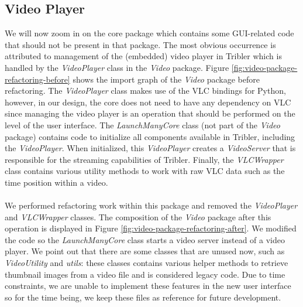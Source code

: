\subsection{Video Player}
We will now zoom in on the core package which contains some GUI-related code that should not be present in that package. The most obvious occurrence is attributed to management of the (embedded) video player in Tribler which is handled by the \emph{VideoPlayer} class in the \emph{Video} package. Figure \ref{fig:video-package-refactoring-before} shows the import graph of the \emph{Video} package before refactoring. The \emph{VideoPlayer} class makes use of the VLC bindings for Python, however, in our design, the core does not need to have any dependency on VLC since managing the video player is an operation that should be performed on the level of the user interface. The \emph{LaunchManyCore} class (not part of the \emph{Video} package) contains code to initialize all components available in Tribler, including the \emph{VideoPlayer}. When initialized, this \emph{VideoPlayer} creates a \emph{VideoServer} that is responsible for the streaming capabilities of Tribler. Finally, the \emph{VLCWrapper} class contains various utility methods to work with raw VLC data such as the time position within a video.\\\\
We performed refactoring work within this package and removed the \emph{VideoPlayer} and \emph{VLCWrapper} classes. The composition of the \emph{Video} package after this operation is displayed in Figure \ref{fig:video-package-refactoring-after}. We modified the code so the \emph{LaunchManyCore} class starts a video server instead of a video player. We point out that there are some classes that are unused now, such as \emph{VideoUtility} and \emph{utils}: these classes contains various helper methods to retrieve thumbnail images from a video file and is considered legacy code. Due to time constraints, we are unable to implement these features in the new user interface so for the time being, we keep these files as reference for future development.

